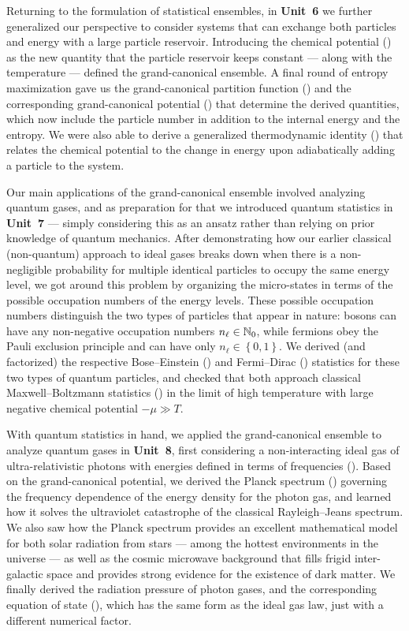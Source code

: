Returning to the formulation of statistical ensembles, in \textbf{Unit~6} we further generalized our perspective to consider systems that can exchange both particles and energy with a large particle reservoir.
Introducing the chemical potential () as the new quantity that the particle reservoir keeps constant --- along with the temperature --- defined the grand-canonical ensemble.
A final round of entropy maximization gave us the grand-canonical partition function () and the corresponding grand-canonical potential () that determine the derived quantities, which now include the particle number in addition to the internal energy and the entropy.
We were also able to derive a generalized thermodynamic identity () that relates the chemical potential to the change in energy upon adiabatically adding a particle to the system.

Our main applications of the grand-canonical ensemble involved analyzing quantum gases, and as preparation for that we introduced quantum statistics in \textbf{Unit~7} --- simply considering this as an ansatz rather than relying on prior knowledge of quantum mechanics.
After demonstrating how our earlier classical (non-quantum) approach to ideal gases breaks down when there is a non-negligible probability for multiple identical particles to occupy the same energy level, we got around this problem by organizing the micro-states in terms of the possible occupation numbers of the energy levels.
These possible occupation numbers distinguish the two types of particles that appear in nature: bosons can have any non-negative occupation numbers $n_{\ell} \in \mathbb N_0$, while fermions obey the Pauli exclusion principle and can have only $n_{\ell} \in \left\{0, 1\right\}$.
We derived (and factorized) the respective Bose--Einstein () and Fermi--Dirac () statistics for these two types of quantum particles, and checked that both approach classical Maxwell--Boltzmann statistics () in the limit of high temperature with large negative chemical potential $-\mu \gg T$.

With quantum statistics in hand, we applied the grand-canonical ensemble to analyze quantum gases in \textbf{Unit~8}, first considering a non-interacting ideal gas of ultra-relativistic photons with energies defined in terms of frequencies ().
Based on the grand-canonical potential, we derived the Planck spectrum () governing the frequency dependence of the energy density for the photon gas, and learned how it solves the ultraviolet catastrophe of the classical Rayleigh--Jeans spectrum.
We also saw how the Planck spectrum provides an excellent mathematical model for both solar radiation from stars --- among the hottest environments in the universe --- as well as the cosmic microwave background that fills frigid inter-galactic space and provides strong evidence for the existence of dark matter.
We finally derived the radiation pressure of photon gases, and the corresponding equation of state (), which has the same form as the ideal gas law, just with a different numerical factor.

